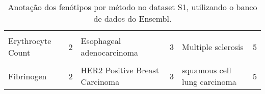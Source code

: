 \begin{table}[!htbp]
{\begin{tabular}[t]{lrlrlr}
\cellcolor{gray!6}{Coronary Artery Disease} & \cellcolor{gray!6}{2} & \cellcolor{gray!6}{Esophageal Squamous Cell Carcinoma} & \cellcolor{gray!6}{3} & \cellcolor{gray!6}{Lung adenocarcinoma} & \cellcolor{gray!6}{5}\\
Erythrocyte Count & 2 & Esophageal adenocarcinoma & 3 & Multiple sclerosis & 5\\
\cellcolor{gray!6}{Estimated glomerular filtration rate} & \cellcolor{gray!6}{2} & \cellcolor{gray!6}{Fibrinogen} & \cellcolor{gray!6}{3} & \cellcolor{gray!6}{Systolic blood pressure} & \cellcolor{gray!6}{5}\\
Fibrinogen & 2 & HER2 Positive Breast Carcinoma & 3 & squamous cell lung carcinoma & 5\\
\bottomrule
\end{tabular}}

\caption{Anotação dos fenótipos por método no dataset S1, utilizando o banco de dados do Ensembl.}
\label{tab:ds1_ensembl_persnp_annot}

\end{table}